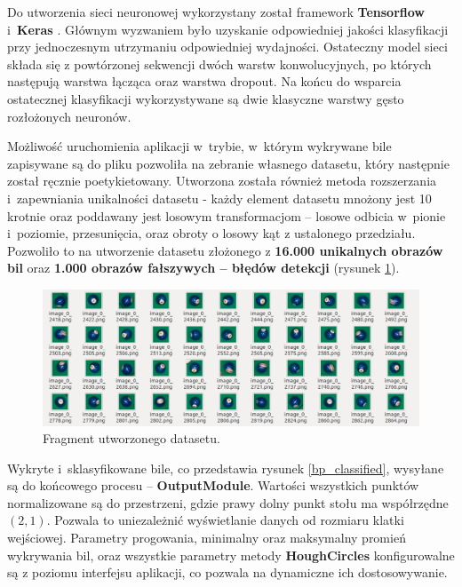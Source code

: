 \documentclass[12pt]{article}
\begin{document}
    
    Do utworzenia sieci neuronowej wykorzystany został framework \textbf{Tensorflow} \cite{TensorFlow} i~\textbf{Keras} \cite{keras}. Głównym wyzwaniem było uzyskanie odpowiedniej jakości klasyfikacji przy jednoczesnym utrzymaniu odpowiedniej wydajności.
    Ostateczny model sieci składa się z powtórzonej sekwencji dwóch warstw konwolucyjnych, po których następują warstwa łącząca oraz warstwa dropout. Na końcu do wsparcia ostatecznej klasyfikacji wykorzystywane są dwie klasyczne warstwy gęsto rozłożonych neuronów. 
    
    
    Możliwość uruchomienia aplikacji w~trybie, w~którym wykrywane bile zapisywane są do pliku pozwoliła na zebranie własnego datasetu, który następnie został ręcznie poetykietowany. Utworzona została również metoda rozszerzania i~zapewniania unikalności datasetu - każdy element datasetu mnożony jest 10 krotnie oraz poddawany jest losowym transformacjom – losowe odbicia w~pionie i~poziomie, przesunięcia, oraz obroty o losowy kąt z ustalonego przedziału. Pozwoliło to na utworzenie datasetu złożonego z \textbf{16.000 unikalnych obrazów bil} oraz \textbf{1.000 obrazów fałszywych – błędów detekcji} (rysunek \ref{dataset}).

    \begin{figure}[!htb]
       \centering
       \includegraphics[width=15cm]{./images/obrazki/klasyfikacja/augmented_data.png}
       \caption{Fragment utworzonego datasetu.}
       \label{dataset}
    \end{figure}

    
    Wykryte i~sklasyfikowane bile, co przedstawia rysunek \ref{bp_classified}, wysyłane są do końcowego procesu – \textbf{OutputModule}. Wartości wszystkich punktów normalizowane są do przestrzeni, gdzie prawy dolny punkt stołu ma współrzędne $(2, 1)$. Pozwala to uniezależnić wyświetlanie danych od rozmiaru klatki wejściowej. Parametry progowania, minimalny oraz maksymalny promień wykrywania bil, oraz wszystkie parametry metody \textbf{HoughCircles} konfigurowalne są z poziomu interfejsu aplikacji, co pozwala na dynamiczne ich dostosowywanie.
\end{document}
